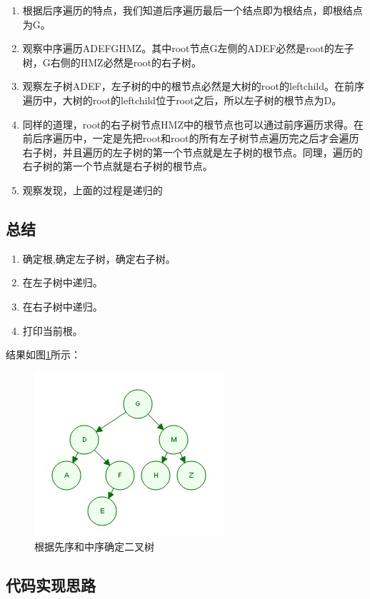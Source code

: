\documentclass[UTF8,a4paper,12pt]{ctexbook}
\begin{document}
		\begin{enumerate}
			\item 根据后序遍历的特点，我们知道后序遍历最后一个结点即为根结点，即根结点为G。
			\item 观察中序遍历ADEFGHMZ。其中root节点G左侧的ADEF必然是root的左子树，G右侧的HMZ必然是root的右子树。
			\item 观察左子树ADEF，左子树的中的根节点必然是大树的root的leftchild。在前序遍历中，大树的root的leftchild位于root之后，所以左子树的根节点为D。
			\item 同样的道理，root的右子树节点HMZ中的根节点也可以通过前序遍历求得。在前后序遍历中，一定是先把root和root的所有左子树节点遍历完之后才会遍历右子树，并且遍历的左子树的第一个节点就是左子树的根节点。同理，遍历的右子树的第一个节点就是右子树的根节点。
			\item 观察发现，上面的过程是递归的
		\end{enumerate}
	
	\subsection{总结}
		\begin{enumerate}
			\item 确定根,确定左子树，确定右子树。
			\item 在左子树中递归。
			\item 在右子树中递归。
			\item 打印当前根。
		\end{enumerate}
		
		结果如图\ref{mid_first}所示：
			\begin{figure}[H]
				\centering
				\includegraphics{Tree_Mid_First}
				\caption{根据先序和中序确定二叉树}
				\label{mid_first}
			\end{figure}
	
	\subsection{代码实现思路}
\end{document}
